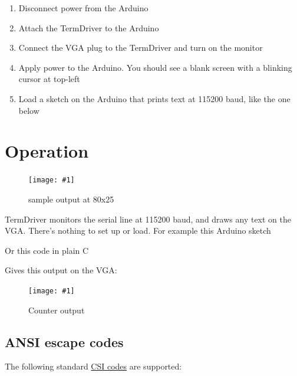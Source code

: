 \documentclass{article}
\newcommand{\png}[2]{
\begin{figure}[H]
\begin{center}
\texttt{[image: \#1]}
\caption{#2}
\end{center}
\end{figure}
}
\begin{document}
\begin{enumerate}
\item Disconnect power from the Arduino
\item Attach the TermDriver to the Arduino
\item Connect the VGA plug to the TermDriver and turn on the monitor
\item Apply power to the Arduino. You should see a blank screen with a blinking cursor at top-left
\item Load a sketch on the Arduino that prints text at 115200 baud, like the one below
\end{enumerate}

\newcommand{\eg}[1]{
\begin{framed}

\end{framed}
}

\eg{termdriver-helloworld}

\section{Operation}

\png{img/page1}{sample output at 80x25}

TermDriver monitors the serial line at 115200 baud, and draws any
text on the VGA.
There's nothing to set up or load.
For example this Arduino sketch

\eg{termdriver-counter1}

\noindent
Or this code in plain C

\eg{termdriver-counter2}

\noindent
Gives this output on the VGA:

\png{img/page2}{Counter output}

\subsection{ANSI escape codes}

The following standard
\href{https://en.wikipedia.org/wiki/ANSI_escape_code\#CSI_sequences}{CSI
codes} are supported:
\end{document}

